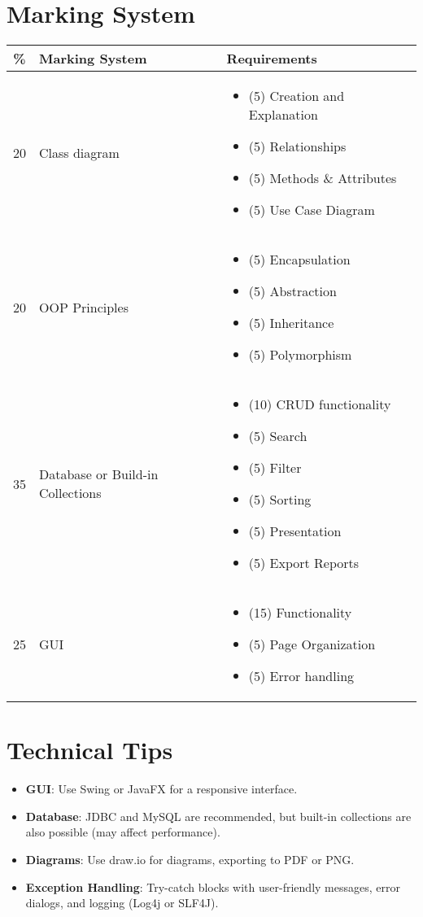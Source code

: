 \documentclass{article}
\begin{document}
\section*{Marking System}
\begin{tabular}{|c|l|p{10cm}|}
\hline
\textbf{\%} & \textbf{Marking System} & \textbf{Requirements} \\
\hline
20 & Class diagram & \begin{itemize}
    \item (5) Creation and Explanation
    \item (5) Relationships
    \item (5) Methods \& Attributes
    \item (5) Use Case Diagram
\end{itemize} \\
\hline
20 & OOP Principles & \begin{itemize}
    \item (5) Encapsulation
    \item (5) Abstraction
    \item (5) Inheritance
    \item (5) Polymorphism
\end{itemize} \\
\hline
35 & Database or Build-in Collections & \begin{itemize}
    \item (10) CRUD functionality
    \item (5) Search
    \item (5) Filter
    \item (5) Sorting
    \item (5) Presentation
    \item (5) Export Reports
\end{itemize} \\
\hline
25 & GUI & \begin{itemize}
    \item (15) Functionality
    \item (5) Page Organization
    \item (5) Error handling
\end{itemize} \\
\hline
\end{tabular}

\section*{Technical Tips}
\begin{itemize}
    \item \textbf{GUI}: Use Swing or JavaFX for a responsive interface.
    \item \textbf{Database}: JDBC and MySQL are recommended, but built-in collections are also possible (may affect performance).
    \item \textbf{Diagrams}: Use draw.io for diagrams, exporting to PDF or PNG.
    \item \textbf{Exception Handling}: Try-catch blocks with user-friendly messages, error dialogs, and logging (Log4j or SLF4J).
\end{itemize}
\end{document}

